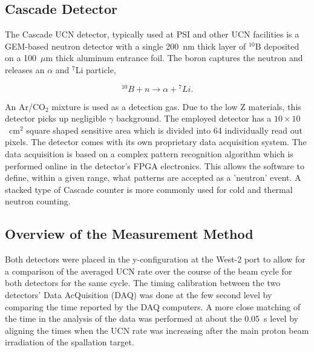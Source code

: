 \documentclass[letter,twocolumn,preprint,3p]{elsarticle}
\begin{document}
\subsection{Cascade Detector}

The Cascade UCN detector, typically used at PSI and other UCN
facilities is a GEM-based neutron detector with a single 200~nm thick
layer of $^{10}$B deposited on a 100~$\mu$m thick aluminum entrance
foil. The boron captures the neutron and releases an $\alpha$ and
$^7$Li particle,

\begin{equation}
^{10}B + n \rightarrow \alpha + {^7}Li.
\end{equation}

An Ar/CO$_2$ mixture is used as a detection gas.  Due to the low Z
materials, this detector picks up negligible $\gamma$ background. The
employed detector has a $10 \times 10$~cm$^2$ square shaped sensitive
area which is divided into 64 individually read out pixels.  The
detector comes with its own proprietary data acquisition system.  The
data acquisition is based on a complex pattern recognition algorithm
which is performed online in the detector's FPGA electronics.  This
allows the software to define, within a given range, what patterns are
accepted as a 'neutron' event.  A stacked type of Cascade counter is
more commonly used for cold and thermal neutron
counting\cite{cascade}.




\subsection{Overview of the Measurement Method}

Both detectors were placed in the y-configuration at the West-2 port
to allow for a comparison of the averaged UCN rate over the course of
the beam cycle for both detectors for the same cycle.  The timing
calibration between the two detectors' Data AcQuisition (DAQ) was done
at the few second level by comparing the time reported by the DAQ
computers.  A more close matching of the time in the analysis of the
data was performed at about the 0.05~s level by aligning the times
when the UCN rate was increasing after the main proton beam
irradiation of the spallation target.
\end{document}
